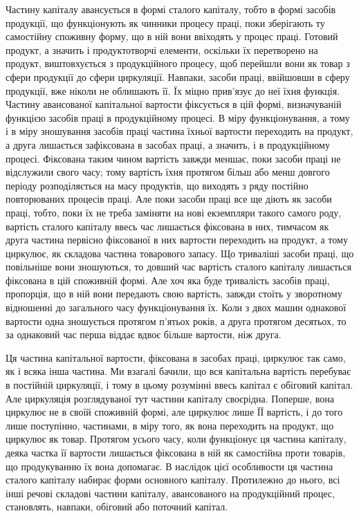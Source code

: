 Частину капіталу авансується в формі сталого капіталу, тобто в формі
засобів продукції, що функціонують як чинники процесу праці, поки
зберігають ту самостійну споживну форму, що в ній вони ввіходять
у процес праці. Готовий продукт, а значить і продуктотворчі елементи,
оскільки їх перетворено на продукт, виштовхується з продукційного
процесу, щоб перейшли вони як товар з сфери продукції до сфери циркуляції.
Навпаки, засоби праці, ввійшовши в сферу продукції, вже ніколи
не облишають її. Їх міцно прив’язує до неї їхня функція. Частину
авансованої капітальної вартости фіксується в цій формі, визначуваній
функцією засобів праці в продукційному процесі. В міру функціонування,
а тому і в міру зношування засобів праці частина їхньої вартости
переходить на продукт, а друга лишається зафіксована в засобах
праці, а значить, і в продукційному процесі. Фіксована таким чином
вартість завжди меншає, поки засоби праці не відслужили свого часу;
тому вартість їхня протягом більш або менш довгого періоду розподіляється
на масу продуктів, що виходять з ряду постійно повторюваних
процесів праці. Але поки засоби праці все ще діють як засоби праці,
тобто, поки їх не треба заміняти на нові екземпляри такого самого роду,
вартість сталого капіталу ввесь час лишається фіксована в них, тимчасом
як друга частина первісно фіксованої в них вартости переходить на
продукт, а тому циркулює, як складова частина товарового запасу. Що
триваліші засоби праці, що повільніше вони зношуються, то довший час
вартість сталого капіталу лишається фіксована в цій споживній формі.
Але хоч яка буде тривалість засобів праці, пропорція, що в ній вони
передають свою вартість, завжди стоїть у зворотному відношенні до
загального часу функціонування їх. Коли з двох машин однакової
вартости одна зношується протягом п’ятьох років, а друга протягом десятьох,
то за однаковий час перша віддає вдвоє більше вартости, ніж
друга.

Ця частина капітальної вартости, фіксована в засобах праці, циркулює
так само, як і всяка інша частина. Ми взагалі бачили, що вся капітальна
вартість перебуває в постійній циркуляції, і тому в цьому розумінні
ввесь капітал є обіговий капітал. Але циркуляція розглядуваної
тут частини капіталу своєрідна. Поперше, вона циркулює не в своїй
споживній формі, але циркулює лише ЇЇ вартість, і до того лише поступінно,
частинами, в міру того, як вона переходить на продукт, що циркулює
як товар. Протягом усього часу, коли функціонує ця частина капіталу,
деяка частка її вартости лишається фіксована в ній як самостійна
проти товарів, що продукуванню їх вона допомагає. В наслідок цієї
особливости ця частина сталого капіталу набирає форми основного
капіталу. Протилежно до нього, всі інші речові складові частини капіталу,
авансованого на продукційний процес, становлять, навпаки, обіговий
або поточний капітал.

